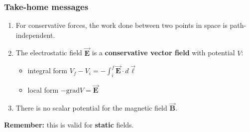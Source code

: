 \documentclass{beamer}
\newcommand{\vc}[1]{\vec{\boldsymbol{#1}}}
\begin{document}
\begin{frame}
\frametitle{Take-home messages}
\begin{enumerate}
	\item For conservative forces, the work done between two points in space is path-independent.
	\item The electrostatic field $\vc{E}$ is a \textbf{conservative vector field} with potential $V$:
	\begin{itemize}
	\item integral form $V_f-V_i=-\int_i^f \vc{E} \cdot d\vc{\ell}$
	\item local form $-\text{grad} V = \vc{E}$
	\end{itemize}
	\item There is no scalar potential for the magnetic field $\vc{B}$.
\end{enumerate}

\textbf{Remember:} this is valid for \textbf{static} fields.
\end{frame}
\end{document}
